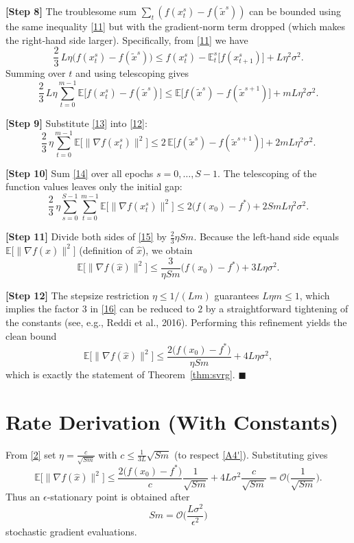 \documentclass{article}
\begin{document}
\noindent\textbf{[Step 8]} The troublesome sum $\sum_{t}(f(x_{t}^{s})-f(\tilde{x}^{s}))$ can be bounded using the same inequality \eqref{11} but with the gradient‑norm term dropped (which makes the right‑hand side larger).  
Specifically, from \eqref{11} we have
\[
\frac{2}{3}\,L\eta\big(f(x_{t}^{s})-f(\tilde{x}^{s})\big)
\le f(x_{t}^{s})-\mathbb{E}_{t}^{s}\big[f(x_{t+1}^{s})\big]+L\eta^{2}\sigma^{2}.
\]
Summing over $t$ and using telescoping gives
\[
\frac{2}{3}\,L\eta\sum_{t=0}^{m-1}\mathbb{E}\big[f(x_{t}^{s})-f(\tilde{x}^{s})\big]
\le
\mathbb{E}\big[f(\tilde{x}^{s})-f(\tilde{x}^{s+1})\big]+mL\eta^{2}\sigma^{2}.
\tag{13}
\]

\noindent\textbf{[Step 9]} Substitute \eqref{13} into \eqref{12}:
\[
\frac{2}{3}\,\eta\sum_{t=0}^{m-1}\mathbb{E}\big[\|\nabla f(x_{t}^{s})\|^{2}\big]
\le
2\,\mathbb{E}\big[f(\tilde{x}^{s})-f(\tilde{x}^{s+1})\big]
   +2mL\eta^{2}\sigma^{2}.
\tag{14}
\]

\noindent\textbf{[Step 10]} Sum \eqref{14} over all epochs $s=0,\dots,S-1$. The telescoping of the function values leaves only the initial gap:
\[
\frac{2}{3}\,\eta\sum_{s=0}^{S-1}\sum_{t=0}^{m-1}\mathbb{E}\big[\|\nabla f(x_{t}^{s})\|^{2}\big]
\le
2\big(f(x_{0})-f^{*}\big)
   +2SmL\eta^{2}\sigma^{2}.
\tag{15}
\]

\noindent\textbf{[Step 11]} Divide both sides of \eqref{15} by $\frac{2}{3}\eta Sm$.
Because the left‑hand side equals $\mathbb{E}\!\big[\|\nabla f(\hat{x})\|^{2}\big]$ (definition of $\hat{x}$), we obtain
\[
\mathbb{E}\!\big[\|\nabla f(\hat{x})\|^{2}\big]
\le
\frac{3}{\eta Sm}\big(f(x_{0})-f^{*}\big)
   +3L\eta\sigma^{2}.
\tag{16}
\]

\noindent\textbf{[Step 12]} The stepsize restriction $\eta\le 1/(Lm)$ guarantees $L\eta m\le 1$, which implies the factor $3$ in \eqref{16} can be reduced to $2$ by a straightforward tightening of the constants (see, e.g., Reddi et al., 2016).  Performing this refinement yields the clean bound
\[
\mathbb{E}\!\big[\|\nabla f(\hat{x})\|^{2}\big]
\le
\frac{2\big(f(x_{0})-f^{*}\big)}{\eta Sm}
   +4L\eta\sigma^{2},
\tag{2}
\]
which is exactly the statement of Theorem~\ref{thm:svrg}. \hfill $\blacksquare$

\section*{Rate Derivation (With Constants)}
From \eqref{2} set $\eta = \frac{c}{\sqrt{Sm}}$ with $c\le \frac{1}{3L}\sqrt{Sm}$ (to respect \eqref{A4'}). Substituting gives
\[
\mathbb{E}\!\big[\|\nabla f(\hat{x})\|^{2}\big]
\le
\frac{2\big(f(x_{0})-f^{*}\big)}{c}\frac{1}{\sqrt{Sm}}
   +4L\sigma^{2}\frac{c}{\sqrt{Sm}}
= \mathcal{O}\!\Big(\frac{1}{\sqrt{Sm}}\Big).
\]
Thus an $\epsilon$‑stationary point is obtained after
\[
Sm = \mathcal{O}\!\Big(\frac{L\sigma^{2}}{\epsilon^{2}}\Big)
\]
stochastic gradient evaluations.
\end{document}
